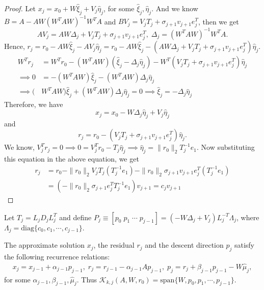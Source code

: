 \documentclass[10pt,a4paper]{article}
\begin{document}
\begin{proof}
Let $x_j=x_0+W\hat{\xi}_j+V_j\hat{\eta}_j$, for some $\hat{\xi}_j, \hat{\eta}_j.$ And we know $B=A-AW(W^TAW)^{-1}W^TA$ and $BV_j=V_jT_j+\sigma_{j+1}v_{j+1}e^T_j$, then we get $$AV_j=AW\Delta_j+V_jT_j+\sigma_{j+1}v_{j+1}e^T_j, \;\Delta_j=(W^TAW)^{-1}W^TA.$$
Hence, $r_j = r_0-AW\hat{\xi}_j-AV_j\hat{\eta}_j = r_0-AW\hat{\xi}_j-(AW\Delta_j+V_jT_j+\sigma_{j+1}v_{j+1}e^T_j)\hat{\eta}_j.$
\begin{align*}
W^Tr_j &= W^Tr_0-(W^TAW)(\hat{\xi}_j-\Delta_j\hat{\eta}_j)-W^T(V_jT_j+\sigma_{j+1}v_{j+1}e^T_j)\hat{\eta}_j \\
\implies 0 &= -(W^TAW)\hat{\xi}_j - (W^TAW)\Delta_j\hat{\eta}_j \\
\implies (&W^TAW)\hat{\xi}_j + (W^TAW)\Delta_j\hat{\eta}_j = 0 \implies \hat{\xi}_j = -\Delta_j\hat{\eta}_j
\end{align*}
Therefore, we have $$x_j = x_0-W\Delta_j\hat{\eta}_j+V_j\hat{\eta}_j$$ and $$r_j = r_0-(V_jT_j+\sigma_{j+1}v_{j+1}e^T_j)\hat{\eta}_j.$$
We know, $V_j^Tr_j=0\implies 0 = V_j^Tr_0-T_j\hat{\eta}_j\implies \hat{\eta}_j = \|r_0\|_2T^{-1}_je_1$. Now substituting this equation in the above equation, we get
\begin{align*}
r_j &= r_0-\|r_0\|_2V_jT_j(T^{-1}_je_1)-\|r_0\|_2\sigma_{j+1}v_{j+1}e^T_j(T^{-1}_je_1) \\
 &= (-\|r_0\|_2\sigma_{j+1}e^T_jT^{-1}_je_1)v_{j+1} = c_jv_{j+1}
\end{align*}
\end{proof}

Let $T_j=L_jD_jL^T_j$ and define $P_j\equiv [p_0\;p_1\;\cdots\;p_{j-1}]=(-W\Delta_j+V_j)L^{-T}_j\Lambda_j$, where $\Lambda_j=\text{diag}\{c_0,c_1,\cdots,c_{j-1}\}.$

\begin{prop}
The approximate solution $x_j$, the residual $r_j$ and the descent direction $p_j$ satisfy the following recurrence relations:
\begin{align*}
x_j=x_{j-1}+\alpha_{j-1}p_{j-1},\;r_j=r_{j-1}-\alpha_{j-1}Ap_{j-1},\;p_j=r_j+\beta_{j-1}p_{j-1}-W\hat{\mu}_j,
\end{align*}
for some $\alpha_{j-1},\beta_{j-1},\hat{\mu}_j.$ Thus $\mathcal{K}_{k,j}(A,W,r_0)=\text{span}\{W,p_0,p_1,\cdots,p_{j-1}\}$.
\end{prop}
\end{document}

